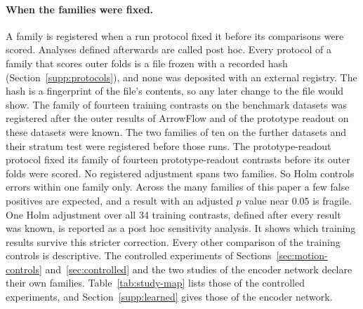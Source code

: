 \paragraph{When the families were fixed.} A family is registered when a run protocol fixed it before its comparisons were scored. Analyses defined afterwards are called post hoc. Every protocol of a family that scores outer folds is a file frozen with a recorded hash (Section~\ref{supp:protocols}), and none was deposited with an external registry. The hash is a fingerprint of the file's contents, so any later change to the file would show. The family of fourteen training contrasts on the benchmark datasets was registered after the outer results of ArrowFlow and of the prototype readout on these datasets were known. The two families of ten on the further datasets and their stratum test were registered before those runs. The prototype-readout protocol fixed its family of fourteen prototype-readout contrasts before its outer folds were scored. No registered adjustment spans two families. So Holm controls errors within one family only. Across the many families of this paper a few false positives are expected, and a result with an adjusted $p$ value near $0.05$ is fragile. One Holm adjustment over all 34 training contrasts, defined after every result was known, is reported as a post hoc sensitivity analysis. It shows which training results survive this stricter correction. Every other comparison of the training controls is descriptive. The controlled experiments of Sections~\ref{sec:motion-controls} and~\ref{sec:controlled} and the two studies of the encoder network declare their own families. Table~\ref{tab:study-map} lists those of the controlled experiments, and Section~\ref{supp:learned} gives those of the encoder network.
